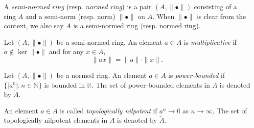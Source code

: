 \begin{definition}
    A \emph{semi-normed ring} (resp. \emph{normed ring}) is a pair $(A,\|\bullet\|)$ consisting of a ring $A$ and a semi-norm (resp. norm) $\|\bullet\|$ on $A$. When $\|\bullet\|$ is clear from the context, we also say $A$ is a semi-normed  ring (resp. normed ring).
\end{definition}

\begin{definition}
    Let $(A,\|\bullet\|)$ be a semi-normed ring. An element $a\in A$ is \emph{multiplicative} if $a\not\in \ker\|\bullet\|$ and for any $x\in A$,
    \[
      \|ax\|=\|a\|\cdot\|x\|.  
    \]
\end{definition}

\begin{definition}\label{def-topnilpowerbdd}
    Let $(A,\|\bullet\|)$ be a normed ring. An element $a\in A$ is \emph{power-bounded} if $\{|a^n|:n\in \mathbb{N}\}$ is bounded in $\mathbb{R}$. The set of power-bounded elements in $A$ is denoted by $\mathring{A}$.

    An element $a\in A$ is called \emph{topologically nilpotent} if $a^n\to 0$ as $n\to\infty$. The set of topologically nilpotent elements in $A$ is denoted by $\check{A}$.


\end{definition}

